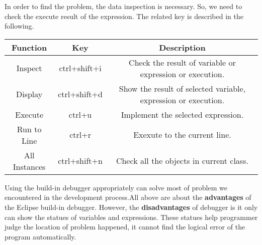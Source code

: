 \documentclass[11pt]{report}
\begin{document}
In order to find the problem, the data inspection is necessary. So, we need to check the execute result of the expression. The related key is described in the following.
\begin{center}
    \begin{tabular}{|c|c|c|}
    \hline
    Function&Key&Description\\
    \hline
    Inspect&ctrl+shift+i&Check the result of variable or expression or execution.\\
    \hline
    Display&ctrl+shift+d&Show the result of selected variable, expression or execution.\\
    \hline
    Execute&ctrl+u&Implement the selected expression.\\
    \hline
    Run to Line&ctrl+r&Exexute to the current line.\\
    \hline
    All Instances&ctrl+shift+n&Check all the objects in current class.\\
    \hline
    \end{tabular}
\end{center}
Using the build-in debugger appropriately can solve most of problem we encountered in the development process.All above are about the \textbf{advantages} of the Eclipse build-in debugger. However, the \textbf{disadvantages} of debugger is it only can show the statues of variables and expressions. These statues help programmer judge the location of problem happened, it cannot find the logical error of the program automatically.
\end{document}
